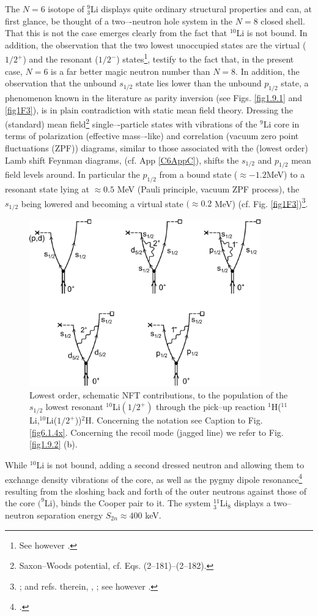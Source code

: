 The $N = 6$ isotope of $^9_3$Li displays quite ordinary structural properties and can, at first
glance, be thought of a two–-neutron hole system in the $N = 8$ closed shell. That this is not the case emerges clearly from the fact that $^{10}$Li is not bound. In addition, the observation that the two lowest unoccupied states are the  virtual ($1/2^+$) and the
resonant ($1/2^-$) states\footnote{See however \cite{Cavallaro:17}.}, testify to the fact that, in the present case,  $N = 6$ is a far better
magic neutron number  than $N = 8$. In addition, the observation  that the unbound $s_{1/2}$
state lies lower than the unbound $p_{1/2}$ state, a phenomenon known in the literature as parity inversion (see Figs. \ref{fig1.9.1} and \ref{fig1F3}), is in   plain contradiction with static mean field
theory. Dressing the (standard) mean field\footnote{ Saxon--Woods potential, cf. \cite{Bohr:69} Eqs. (2--181)--(2--182).} single–-particle states with vibrations of the $^9$Li core  in terms of
polarization (effective mass–-like) and correlation  (vacuum zero point fluctuations
(ZPF)) diagrams, similar to those associated with the (lowest order) Lamb shift Feynman
diagrams, (cf. App \ref{C6AppC}), shifts the $s_{1/2}$ and $p_{1/2}$ mean field levels around. In particular the $p_{1/2}$ from a
bound state ($\approx-1.2$MeV) to a resonant state lying at $\approx0.5$ MeV (Pauli principle, vacuum
ZPF process), the $s_{1/2}$ being lowered and becoming a virtual state $(\approx 0.2$ MeV) (cf. Fig. \ref{fig1F3})\footnote{\cite{Barranco:01}; and refs. therein, \cite{Tanihata:13}, \cite{Sanetullaev:16}; see however \cite{Cavallaro:17}.}.
 \begin{figure}
\centerline{\includegraphics*[width=10cm,angle=0]{C6/figs_C6/fig4_2_7}}
\caption{Lowest order, schematic NFT contributions, to the population of the $s_{1/2}$ lowest resonant $^{10}$Li$(1/2^+)$ through the pick--up reaction $^1$H($^{11}$Li,$^{10}$Li($1/2^+$))$^2$H. Concerning the notation see Caption to Fig. \ref{fig6.1.4x}. Concerning the recoil mode (jagged line) we refer to Fig. \ref{fig1.9.2} (b).}\label{fig4.2.7}
\end{figure}
While $^{10}$Li is not bound, adding a second dressed neutron and allowing them to exchange density vibrations of the  core, as well as the pygmy dipole resonance\footnote{\cite{Broglia:19}.} resulting from the sloshing back and forth of the outer neutrons against those of the core $(^9$Li), binds the Cooper pair to it. The system $^{11}_{3}$Li$_8$ displays a two--neutron separation energy $S_{2n}\approx 400$ keV.



